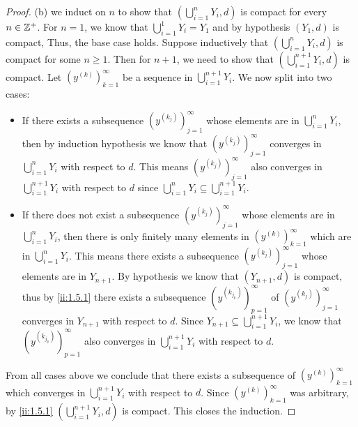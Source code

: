 \begin{proof}{(b)}
  we induct on \(n\) to show that \((\bigcup_{i = 1}^n Y_i, d)\) is compact for every \(n \in \mathbb{Z}^+\).
  For \(n = 1\), we know that \(\bigcup_{i = 1}^1 Y_i = Y_1\) and by hypothesis \((Y_1, d)\) is compact, Thus, the base case holds.
  Suppose inductively that \((\bigcup_{i = 1}^n Y_i, d)\) is compact for some \(n \geq 1\).
  Then for \(n + 1\), we need to show that \((\bigcup_{i = 1}^{n + 1} Y_i, d)\) is compact.
  Let \((y^{(k)})_{k = 1}^\infty\) be a sequence in \(\bigcup_{i = 1}^{n + 1} Y_i\).
  We now split into two cases:
  \begin{itemize}
    \item If there exists a subsequence \((y^{(k_j)})_{j = 1}^\infty\) whose elements are in \(\bigcup_{i = 1}^n Y_i\), then by induction hypothesis we know that \((y^{(k_j)})_{j = 1}^\infty\) converges in \(\bigcup_{i = 1}^n Y_i\) with respect to \(d\).
          This means \((y^{(k_j)})_{j = 1}^\infty\) also converges in \(\bigcup_{i = 1}^{n + 1} Y_i\) with respect to \(d\) since \(\bigcup_{i = 1}^n Y_i \subseteq \bigcup_{i = 1}^{n + 1} Y_i\).
    \item If there does not exist a subsequence \((y^{(k_j)})_{j = 1}^\infty\) whose elements are in \(\bigcup_{i = 1}^n Y_i\), then there is only finitely many elements in \((y^{(k)})_{k = 1}^\infty\) which are in \(\bigcup_{i = 1}^n Y_i\).
          This means there exists a subsequence \((y^{(k_j)})_{j = 1}^\infty\) whose elements are in \(Y_{n + 1}\).
          By hypothesis we know that \((Y_{n + 1}, d)\) is compact, thus by \cref{ii:1.5.1} there exists a subsequence \((y^{(k_{j_p})})_{p = 1}^\infty\) of \((y^{(k_j)})_{j = 1}^\infty\) converges in \(Y_{n + 1}\) with respect to \(d\).
          Since \(Y_{n + 1} \subseteq \bigcup_{i = 1}^{n + 1} Y_i\), we know that \((y^{(k_{j_p})})_{p = 1}^\infty\) also converges in \(\bigcup_{i = 1}^{n + 1} Y_i\) with respect to \(d\).
  \end{itemize}
  From all cases above we conclude that there exists a subsequence of \((y^{(k)})_{k = 1}^\infty\) which converges in \(\bigcup_{i = 1}^{n + 1} Y_i\) with respect to \(d\).
  Since \((y^{(k)})_{k = 1}^\infty\) was arbitrary, by \cref{ii:1.5.1} \((\bigcup_{i = 1}^{n + 1} Y_i, d)\) is compact.
  This closes the induction.
\end{proof}

